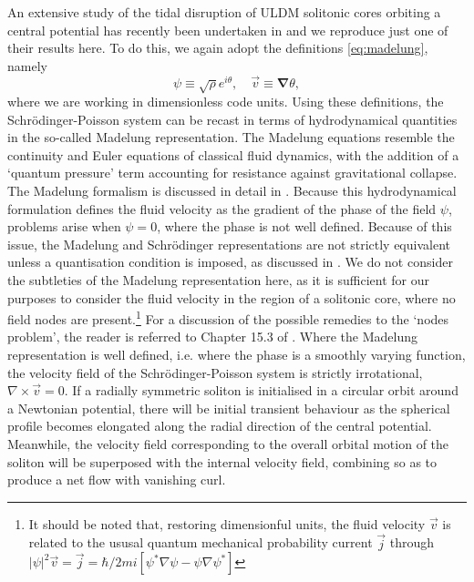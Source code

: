 \documentclass[a4paper,11pt]{article}
\begin{document}
An extensive study of the tidal disruption of ULDM solitonic cores orbiting a central potential has recently been undertaken in \cite{Du:2018zrg} and we reproduce just one of their results here. To do this, we again adopt the definitions \ref{eq:madelung}, namely
\begin{equation}\label{eq:madelung_repeated}
    \psi\equiv\sqrt{\rho}e^{i\theta}, \quad \vec{v}\equiv\boldsymbol{\nabla}\theta,
\end{equation}
where we are working in dimensionless code units. Using these definitions, the Schr{\"o}dinger-Poisson system can be recast in terms of hydrodynamical quantities in the so-called Madelung representation. The Madelung equations resemble the continuity and Euler equations of classical fluid dynamics, with the addition of a `quantum pressure' term accounting for resistance against gravitational collapse. The Madelung formalism is discussed in detail in \cite{Suarez:2011yf, Suarez:2015uva, Johnston:2009wz, Kopp:2017hbb}. Because this hydrodynamical formulation defines the fluid velocity as the gradient of the phase of the field $\psi$, problems arise when $\psi=0$, where the phase is not well defined. Because of this issue, the Madelung and Schr{\"o}dinger representations are not strictly equivalent unless a quantisation condition is imposed, as discussed in \cite{Wallstrom:1994fp}. We do not consider the subtleties of the Madelung representation here, as it is sufficient for our purposes to consider the fluid velocity in the region of a solitonic core, where no field nodes are present.\footnote{It should be noted that, restoring dimensionful units, the fluid velocity $\vec{v}$ is related to the ususal quantum mechanical probability current $\vec{j}$ through $\vert\psi\vert^2\vec{v} = \vec{j} = \hbar/2mi\left[\psi^*\nabla\psi-\psi\nabla\psi^*\right]$} For a discussion of the possible remedies to the `nodes problem', the reader is referred to Chapter 15.3 of \cite{Wyatt:2005uc}.
Where the Madelung representation is well defined, i.e. where the phase is a smoothly varying function, the velocity field of the Schr{\"o}dinger-Poisson system is strictly irrotational, $\nabla\times\vec{v}=0$. If a radially symmetric soliton is initialised in a circular orbit around a Newtonian potential, there will be initial transient behaviour as the spherical profile becomes elongated along the radial direction of the central potential. Meanwhile, the velocity field corresponding to the overall orbital motion of the soliton will be superposed with the internal velocity field, combining so as to produce a net flow with vanishing curl. 
\end{document}
